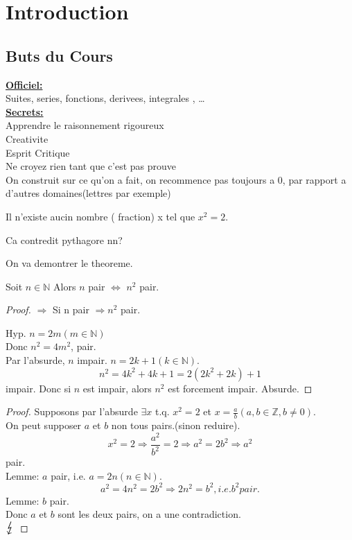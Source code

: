 \documentclass[../main.tex]{subfiles}
\begin{document}

\chapter{Introduction}
\section{Buts du Cours}
\textbf{\underline{Officiel:}}\\
Suites, series, fonctions, derivees, integrales , \ldots\\

\textbf{ \underline{Secrets:}}\\
Apprendre le raisonnement rigoureux\\
Creativite\\
Esprit Critique\\
Ne croyez rien tant que c'est pas prouve\\

On construit sur ce qu'on a fait, on recommence pas toujours a $0$, par rapport a d'autres domaines(lettres par exemple)

\begin{thm}[env. -400]\label{thm:env_400}
	Il n'existe aucin nombre ( fraction) x tel que $x^{2} = 2$.
\end{thm}


Ca contredit pythagore nn?

On va demontrer le theoreme.\\
\begin{lemma}[Lemme]\label{lemma:lemme}
	Soit $n \in \mathbb{N}$ 
	Alors $n$ pair $\iff$  $n^{2}$ pair.
\end{lemma}
\begin{proof}
$\Rightarrow$ Si n pair $\Rightarrow n^{2}$ pair.

Hyp. $n = 2m ( m \in \mathbb{N})$ \\
Donc $n^{2} = 4m^{2}$, pair. \\

Par l'absurde, $n$ impair. $n=2k + 1 ( k \in \mathbb{N})$.\\
\[ 
	n^{2} = 4k^{2} + 4k + 1 = 2 ( 2k^{2} + 2k) + 1
\]
impair.
Donc si $n$ est impair, alors $n^{2}$ est forcement impair.
Absurde. 
\end{proof}
\begin{proof}
	Supposons par l'absurde $\exists x$ t.q. $x^{2} = 2$ et $x= \frac{a}{b} ( a,b \in \mathbb{Z}, b \neq 0)$.\\
	On peut supposer $a$ et $b$ non tous pairs.(sinon reduire).
	\[ 
	x^{2} = 2 \Rightarrow \frac{a^{2}}{b^{2}} = 2 \Rightarrow a^{2} = 2b^{2} \Rightarrow a^{2}
	\] 
	pair.\\
	Lemme: $a$ pair, i.e. $a=2n ( n \in \mathbb{N})$.
	\[ 
	a^{2}=4n^{2} = 2b^{2} \Rightarrow  2 n^{2} = b^{2}, i.e. b^{2} pair.
	\]
	Lemme: $b$ pair.\\
	Donc $a$ et $b$ sont les deux pairs, on a une contradiction.\\
	$\contra$
\end{proof}
\end{document}
